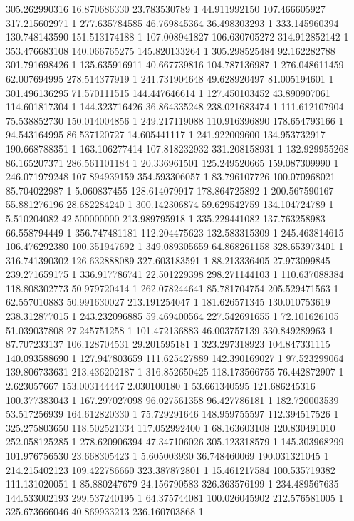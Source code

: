 305.262990316	16.870686330	23.783530789	1
44.911992150	107.466605927	317.215602971	1
277.635784585	46.769845364	36.498303293	1
333.145960394	130.748143590	151.513174188	1
107.008941827	106.630705272	314.912852142	1
353.476683108	140.066765275	145.820133264	1
305.298525484	92.162282788	301.791698426	1
135.635916911	40.667739816	104.787136987	1
276.048611459	62.007694995	278.514377919	1
241.731904648	49.628920497	81.005194601	1
301.496136295	71.570111515	144.447646614	1
127.450103452	43.890907061	114.601817304	1
144.323716426	36.864335248	238.021683474	1
111.612107904	75.538852730	150.014004856	1
249.217119088	110.916396890	178.654793166	1
94.543164995	86.537120727	14.605441117	1
241.922009600	134.953732917	190.668788351	1
163.106277414	107.818232932	331.208158931	1
132.929955268	86.165207371	286.561101184	1
20.336961501	125.249520665	159.087309990	1
246.071979248	107.894939159	354.593306057	1
83.796107726	100.070968021	85.704022987	1
5.060837455	128.614079917	178.864725892	1
200.567590167	55.881276196	28.682284240	1
300.142306874	59.629542759	134.104724789	1
5.510204082	42.500000000	213.989795918	1
335.229441082	137.763258983	66.558794449	1
356.747481181	112.204475623	132.583315309	1
245.463814615	106.476292380	100.351947692	1
349.089305659	64.868261158	328.653973401	1
316.741390302	126.632888089	327.603183591	1
88.213336405	27.973099845	239.271659175	1
336.917786741	22.501229398	298.271144103	1
110.637088384	118.808302773	50.979720414	1
262.078244641	85.781704754	205.529471563	1
62.557010883	50.991630027	213.191254047	1
181.626571345	130.010753619	238.312877015	1
243.232096885	59.469400564	227.542691655	1
72.101626105	51.039037808	27.245751258	1
101.472136883	46.003757139	330.849289963	1
87.707233137	106.128704531	29.201595181	1
323.297318923	104.847331115	140.093588690	1
127.947803659	111.625427889	142.390169027	1
97.523299064	139.806733631	213.436202187	1
316.852650425	118.173566755	76.442872907	1
2.623057667	153.003144447	2.030100180	1
53.661340595	121.686245316	100.377383043	1
167.297027098	96.027561358	96.427786181	1
182.720003539	53.517256939	164.612820330	1
75.729291646	148.959755597	112.394517526	1
325.275803650	118.502521334	117.052992400	1
68.163603108	120.830491010	252.058125285	1
278.620906394	47.347106026	305.123318579	1
145.303968299	101.976756530	23.668305423	1
5.605003930	36.748460069	190.031321045	1
214.215402123	109.422786660	323.387872801	1
15.461217584	100.535719382	111.131020051	1
85.880247679	24.156790583	326.363576199	1
234.489567635	144.533002193	299.537240195	1
64.375744081	100.026045902	212.576581005	1
325.673666046	40.869933213	236.160703868	1
